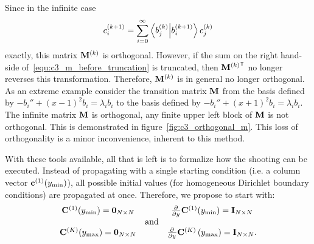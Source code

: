Since in the infinite case
\begin{equation}\label{equ:c3_m_before_truncation}
  c^{(k+1)}_i = \sum_{i=0}^{\infty} \bra{b_j^{(k)}}\ket{b_i^{(k+1)}} c^{(k)}_j
\end{equation}
exactly, this matrix $\vb{M}^{(k)}$ is orthogonal. However, if the sum on the right hand-side of~\eqref{equ:c3_m_before_truncation} is truncated, then ${\vb{M}^{(k)}}^\intercal$ no longer reverses this transformation. Therefore, $\vb{M}^{(k)}$ is in general no longer orthogonal. As an extreme example consider the transition matrix $\vb{M}$ from the basis defined by $-b_i'' + (x-1)^2 b_i = \lambda_i b_i$ to the basis defined by $-b_i'' + (x+1)^2 b_i = \lambda_i b_i$. The infinite matrix $\vb{M}$ is orthogonal, any finite upper left block of $\vb{M}$ is not orthogonal. This is demonstrated in figure~\ref{fig:c3_orthogonal_m}. This loss of orthogonality is a minor inconvenience, inherent to this method.

With these tools available, all that is left is to formalize how the shooting can be executed. Instead of propagating with a single starting condition (i.e. a column vector $\vb{c}^{(1)}({y_{\text{min}}})$), all possible initial values (for homogeneous Dirichlet boundary conditions) are propagated at once. Therefore, we propose to start with:
$$
  \begin{matrix}
    \vb{C}^{(1)}({y_{\text{min}}}) = \vb{0}_{N\times N} &            & {\pdv[]{}{y}}\vb{C}^{(1)}({y_{\text{min}}}) = \vb{I}_{N\times N}                    \\
                                             & \text{and} &                                                                          \\
    \vb{C}^{(K)}({y_{\text{max}}}) = \vb{0}_{N\times N} &            & {\pdv[]{}{y}}\vb{C}^{(K)}\left({y_{\text{max}}}\right) = \vb{I}_{N\times N}\text{.}
  \end{matrix}
$$

